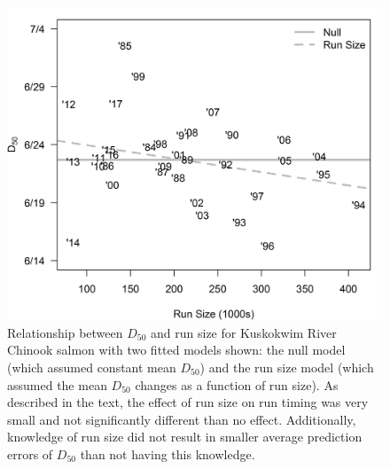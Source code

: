 \documentclass[12pt,]{book}
\theoremstyle{definition}
\theoremstyle{definition}
\theoremstyle{definition}
\theoremstyle{remark}
\begin{document}
\begin{figure}
  \centering
  \includegraphics{img/Ch2/rt-n.png}
  \caption{Relationship between $D_{50}$ and run size for Kuskokwim River Chinook salmon with two fitted models shown: the null model (which assumed constant mean $D_{50}$) and the run size model (which assumed the mean $D_{50}$ changes as a function of run size). As described in the text, the effect of run size on run timing was very small and not significantly different than no effect. Additionally, knowledge of run size did not result in smaller average prediction errors of $D_{50}$ than not having this knowledge.}
  \label{fig:rt-n}
\end{figure}

\setlength{\parskip}{6pt plus 2pt minus 1pt}


\end{document}
